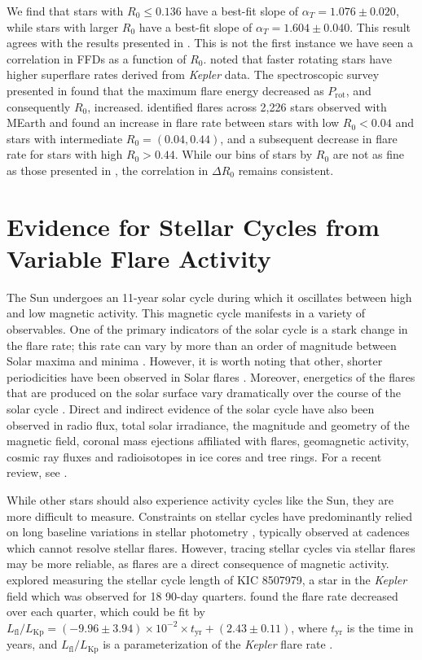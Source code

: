 \documentclass[twocolumn, linenumbers]{aastex631}
\begin{document}
We find that stars with $R_0 \leq 0.136$ have a best-fit slope of $\alpha_T = 1.076 \pm 0.020$, while stars with larger $R_0$ have a best-fit slope of $\alpha_T = 1.604 \pm 0.040$. This
result agrees with the results presented in \cite{seligman22}. This is not the first instance we have seen a correlation in FFDs as a function of $R_0$. \cite{candelaresi14} noted that
faster rotating stars have higher superflare rates derived from \textit{Kepler} data. The spectroscopic survey presented in \cite{notsu19} found that the maximum flare energy decreased
as $P_\textrm{rot}$, and consequently $R_0$, increased. \cite{mondrik19} identified flares across 2,226 stars observed with MEarth and found an increase in flare rate between stars with
low $R_0 < 0.04$ and stars with intermediate $R_0 = (0.04, 0.44)$, and a subsequent decrease in flare rate for stars with high $R_0 > 0.44$. While our bins of stars by $R_0$ are not as
fine as those presented in \cite{mondrik19}, the correlation in $\Delta R_0$ remains consistent.



\section{Evidence for Stellar Cycles from Variable Flare Activity}\label{sec:cycles}

The Sun undergoes an 11-year solar cycle during  which it oscillates between high and low magnetic activity. This magnetic cycle manifests  in a variety of observables. One of the primary
indicators of the solar cycle is a stark change in the flare rate; this rate can vary by more than an order of magnitude between Solar maxima and minima \citep{webb94}. However, it is worth
noting that other, shorter periodicities have been observed in Solar flares \citep{}. Moreover, energetics of the flares that are produced on the solar surface vary dramatically over the
course of the solar cycle \citep{Bai1987,Bai2003}. Direct and indirect evidence  of the solar cycle have also been observed in radio flux, total solar irradiance, the magnitude and geometry
of the magnetic field, coronal mass ejections affiliated with flares, geomagnetic activity, cosmic ray fluxes and radioisotopes in ice cores and tree rings. For a recent review, see \citet{Hathaway2015}.


While other stars should also experience activity cycles like the Sun, they are more difficult to measure. Constraints on stellar cycles have predominantly relied on long baseline variations
in stellar photometry \citep[see recent reviews by ][]{jeffers23, isik23}, typically observed at cadences which cannot resolve stellar flares. However,  tracing stellar cycles via stellar
flares may be more reliable, as flares are a direct consequence of magnetic activity. \cite{} explored measuring the stellar cycle length of KIC 8507979, a star in the \textit{Kepler} field
which was observed for 18 90-day quarters. \cite{scoggins19} found the flare rate decreased over each quarter, which could be fit by
$L_\textrm{fl}/L_\textrm{Kp} = (-9.96 \pm 3.94) \times 10^{-2} \times t_\textrm{yr} + (2.43 \pm 0.11)$, where $t_\textrm{yr}$ is the time in years, and $L_\textrm{fl}/L_\textrm{Kp}$ is a
parameterization of the \textit{Kepler} flare rate \citep{lurie15}.
\end{document}
